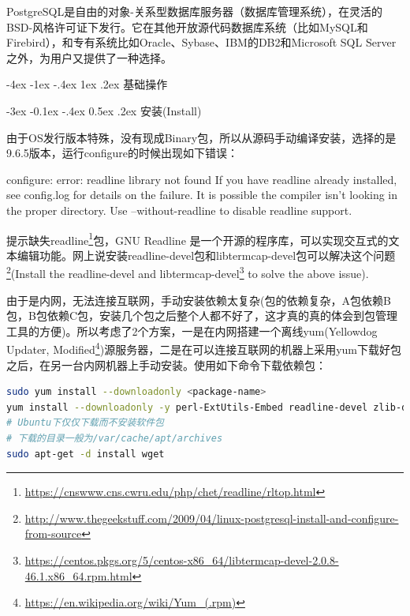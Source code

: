 \documentclass[12pt]{book}
\makeatletter
\numberwithin{dummy}{section}
\theoremstyle{ocrenumbox}
\theoremstyle{blacknumex}
\theoremstyle{blacknumbox}
\theoremstyle{ocrenum}
\renewcommand{\section}{\@startsection{section}{1}{\z@}
	{-4ex \@plus -1ex \@minus -.4ex}
	{1ex \@plus.2ex }
	{\normalfont\large\sffamily\bfseries}}
\renewcommand{\subsection}{\@startsection {subsection}{2}{\z@}
	{-3ex \@plus -0.1ex \@minus -.4ex}
	{0.5ex \@plus.2ex }
	{\normalfont\sffamily\bfseries}}
\makeatother
\begin{document}
PostgreSQL是自由的对象-关系型数据库服务器（数据库管理系统），在灵活的BSD-风格许可证下发行。它在其他开放源代码数据库系统（比如MySQL和Firebird），和专有系统比如Oracle、Sybase、IBM的DB2和Microsoft SQL Server之外，为用户又提供了一种选择。

\section{基础操作}

\subsection{安装(Install)}

由于OS发行版本特殊，没有现成Binary包，所以从源码手动编译安装，选择的是9.6.5版本，运行configure的时候出现如下错误：

configure: error: readline library not found
If you have readline already installed, see config.log for details on the
failure.  It is possible the compiler isn't looking in the proper directory.
Use --without-readline to disable readline support.

提示缺失readline\footnote{\url{https://cnswww.cns.cwru.edu/php/chet/readline/rltop.html}}包，GNU Readline 是一个开源的程序库，可以实现交互式的文本编辑功能。网上说安装readline-devel包和libtermcap-devel包可以解决这个问题\footnote{\url{http://www.thegeekstuff.com/2009/04/linux-postgresql-install-and-configure-from-source}}(Install the readline-devel and libtermcap-devel\footnote{\url{https://centos.pkgs.org/5/centos-x86_64/libtermcap-devel-2.0.8-46.1.x86_64.rpm.html}} to solve the above issue).

由于是内网，无法连接互联网，手动安装依赖太复杂(包的依赖复杂，A包依赖B包，B包依赖C包，安装几个包之后整个人都不好了，这才真的真的体会到包管理工具的方便)。所以考虑了2个方案，一是在内网搭建一个离线yum(Yellowdog Updater, Modified\footnote{\url{https://en.wikipedia.org/wiki/Yum_(.rpm)}})源服务器，二是在可以连接互联网的机器上采用yum下载好包之后，在另一台内网机器上手动安装。使用如下命令下载依赖包：

\begin{lstlisting}[language=Bash]
sudo yum install --downloadonly <package-name>
yum install --downloadonly -y perl-ExtUtils-Embed readline-devel zlib-devel pam-devel libxml2-devel libxslt-devel openldap-devel python-devel gcc-c++ openssl-devel cmake
# Ubuntu下仅仅下载而不安装软件包
# 下载的目录一般为/var/cache/apt/archives
sudo apt-get -d install wget
\end{lstlisting}
\end{document}
